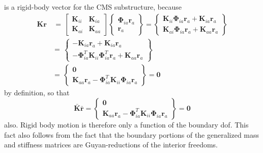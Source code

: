 \documentclass[11pt,openany,twoside]{book}
\numberwithin{equation}{section}		%
\newcommand{\Matrix}[1]{\boldsymbol{#1}}
\newcommand{\Vector}[1]{\boldsymbol{#1}}
\begin{document}
is a rigid-body vector for the CMS substructure, because
\begin{equation}
\begin{split}
\Matrix{K}\Vector{r} & \, = \, \left[
\begin{array}{cc}
   \Matrix{K}_{ii} & \Matrix{K}_{ia} \\
   \Matrix{K}_{ai} & \Matrix{K}_{aa}
\end{array}
\right] \left\{
\begin{array}{c}
   \Matrix{\Phi}_{ia} \Matrix{r}_a \\
   \Matrix{r}_a
\end{array}
\right\} =  \left\{
\begin{array}{c}
   \Matrix{K}_{ii} \Matrix{\Phi}_{ia} \Matrix{r}_a + \Matrix{K}_{ia} \Matrix{r}_a \\
   \Matrix{K}_{ai} \Matrix{\Phi}_{ia} \Matrix{r}_a + \Matrix{K}_{aa} \Matrix{r}_a
\end{array}
\right\}                                        \\
 & = \, \left\{
\begin{array}{c}
   - \Matrix{K}_{ia} \Vector{r}_a + \Matrix{K}_{ia} \Vector{r}_a \\
   - \Matrix{\Phi}_{ia}^T \Matrix{K}_{ii} \Matrix{\Phi}_{ia}^T \Vector{r}_a +
                \Matrix{K}_{aa} \Vector{r}_a
\end{array}
\right\} \\
 & = \, \left\{
\begin{array}{c}
   \Matrix{0} \\
   \Matrix{K}_{aa} \Vector{r}_a -
                        \Matrix{\Phi}_{ia}^T \Matrix{K}_{ii} \Matrix{\Phi}_{ia} \Vector{r}_a
\end{array}
\right\} = \Vector{0}
\end{split}		\nonumber
\end{equation}
by definition, so that
\begin{equation}
\Matrix{\bar{K}} \Matrix{\bar{r}} = \left\{
\begin{array}{c}
   \Vector{0} \\
   \Matrix{K}_{aa} \Vector{r}_a - \Matrix{\Phi}_{ia}^T \Matrix{K}_{ii} \Matrix{\Phi}_{ia} \Vector{r}_a
\end{array}
\right\} = \Vector{0}		\nonumber
\end{equation}
also. Rigid body motion is therefore only a function of the
boundary dof. This fact also follows from the fact
that the boundary portions of the generalized mass and
stiffness matrices are Guyan-reductions of the
interior freedoms.
\end{document}
